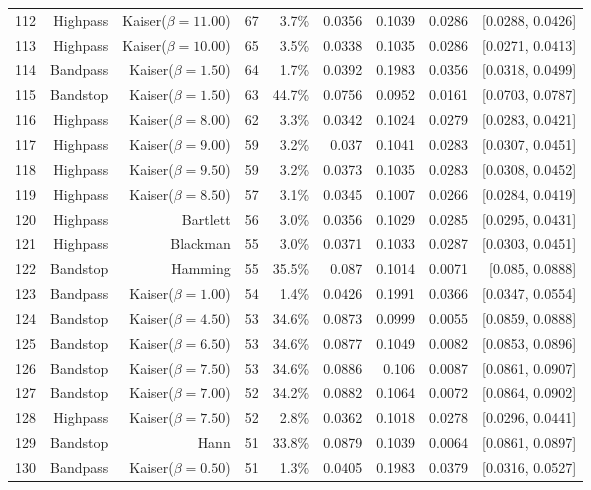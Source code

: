 \begin{longtable}{lrrrrrrrr}
    112 & Highpass & Kaiser($\beta=11.00$) & 67 & 3.7\% & 0.0356 & 0.1039 & 0.0286 & [0.0288, 0.0426] \\
    113 & Highpass & Kaiser($\beta=10.00$) & 65 & 3.5\% & 0.0338 & 0.1035 & 0.0286 & [0.0271, 0.0413] \\
    114 & Bandpass & Kaiser($\beta=1.50$) & 64 & 1.7\% & 0.0392 & 0.1983 & 0.0356 & [0.0318, 0.0499] \\
    115 & Bandstop & Kaiser($\beta=1.50$) & 63 & 44.7\% & 0.0756 & 0.0952 & 0.0161 & [0.0703, 0.0787] \\
    116 & Highpass & Kaiser($\beta=8.00$) & 62 & 3.3\% & 0.0342 & 0.1024 & 0.0279 & [0.0283, 0.0421] \\
    117 & Highpass & Kaiser($\beta=9.00$) & 59 & 3.2\% & 0.037 & 0.1041 & 0.0283 & [0.0307, 0.0451] \\
    118 & Highpass & Kaiser($\beta=9.50$) & 59 & 3.2\% & 0.0373 & 0.1035 & 0.0283 & [0.0308, 0.0452] \\
    119 & Highpass & Kaiser($\beta=8.50$) & 57 & 3.1\% & 0.0345 & 0.1007 & 0.0266 & [0.0284, 0.0419] \\
    120 & Highpass & Bartlett & 56 & 3.0\% & 0.0356 & 0.1029 & 0.0285 & [0.0295, 0.0431] \\
    121 & Highpass & Blackman & 55 & 3.0\% & 0.0371 & 0.1033 & 0.0287 & [0.0303, 0.0451] \\
    122 & Bandstop & Hamming & 55 & 35.5\% & 0.087 & 0.1014 & 0.0071 & [0.085, 0.0888] \\
    123 & Bandpass & Kaiser($\beta=1.00$) & 54 & 1.4\% & 0.0426 & 0.1991 & 0.0366 & [0.0347, 0.0554] \\
    124 & Bandstop & Kaiser($\beta=4.50$) & 53 & 34.6\% & 0.0873 & 0.0999 & 0.0055 & [0.0859, 0.0888] \\
    125 & Bandstop & Kaiser($\beta=6.50$) & 53 & 34.6\% & 0.0877 & 0.1049 & 0.0082 & [0.0853, 0.0896] \\
    126 & Bandstop & Kaiser($\beta=7.50$) & 53 & 34.6\% & 0.0886 & 0.106 & 0.0087 & [0.0861, 0.0907] \\
    127 & Bandstop & Kaiser($\beta=7.00$) & 52 & 34.2\% & 0.0882 & 0.1064 & 0.0072 & [0.0864, 0.0902] \\
    128 & Highpass & Kaiser($\beta=7.50$) & 52 & 2.8\% & 0.0362 & 0.1018 & 0.0278 & [0.0296, 0.0441] \\
    129 & Bandstop & Hann & 51 & 33.8\% & 0.0879 & 0.1039 & 0.0064 & [0.0861, 0.0897] \\
    130 & Bandpass & Kaiser($\beta=0.50$) & 51 & 1.3\% & 0.0405 & 0.1983 & 0.0379 & [0.0316, 0.0527] \\

\end{longtable}
